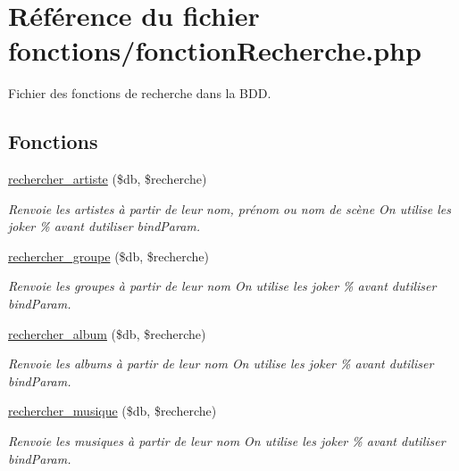 \hypertarget{fonctionRecherche_8php}{}\section{Référence du fichier fonctions/fonction\+Recherche.php}
\label{fonctionRecherche_8php}


Fichier des fonctions de recherche dans la B\+DD.  


\subsection*{Fonctions}
\begin{DoxyCompactItemize}
\item 
\hyperlink{fonctionRecherche_8php_a498b02bfe9256ba9d482522c56f9d7e7}{rechercher\+\_\+artiste} (\$db, \$recherche)
\begin{DoxyCompactList}\small\item\em Renvoie les artistes à partir de leur nom, prénom ou nom de scène On utilise les joker \% avant d\textquotesingle{}utiliser bind\+Param. \end{DoxyCompactList}\item 
\hyperlink{fonctionRecherche_8php_ad698711d776696b07caa7e2fb02ff453}{rechercher\+\_\+groupe} (\$db, \$recherche)
\begin{DoxyCompactList}\small\item\em Renvoie les groupes à partir de leur nom On utilise les joker \% avant d\textquotesingle{}utiliser bind\+Param. \end{DoxyCompactList}\item 
\hyperlink{fonctionRecherche_8php_a83ea610ab61d5e40930cc7ce08d7f3cd}{rechercher\+\_\+album} (\$db, \$recherche)
\begin{DoxyCompactList}\small\item\em Renvoie les albums à partir de leur nom On utilise les joker \% avant d\textquotesingle{}utiliser bind\+Param. \end{DoxyCompactList}\item 
\hyperlink{fonctionRecherche_8php_a217c5282b202927aea5a37d860a5fdbc}{rechercher\+\_\+musique} (\$db, \$recherche)
\begin{DoxyCompactList}\small\item\em Renvoie les musiques à partir de leur nom On utilise les joker \% avant d\textquotesingle{}utiliser bind\+Param. \end{DoxyCompactList}\end{DoxyCompactItemize}


